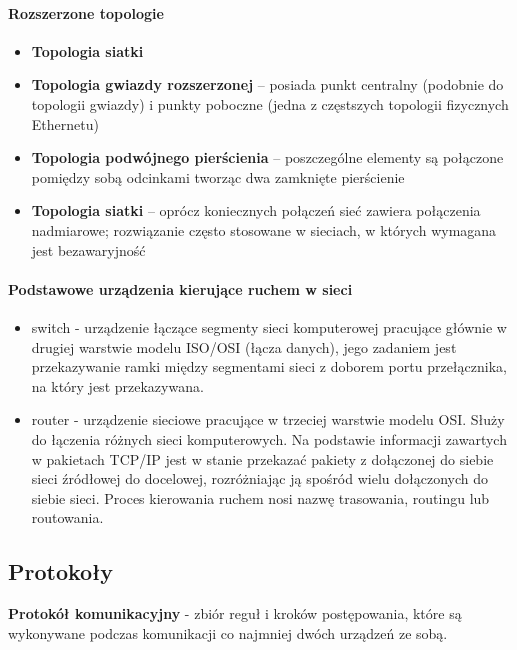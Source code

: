 \documentclass[a4paper,twoside]{report}
\begin{document}
\paragraph{Rozszerzone topologie}
\begin{itemize}
\item \textbf{Topologia siatki}
\item \textbf{Topologia gwiazdy rozszerzonej} – posiada punkt centralny (podobnie do topologii gwiazdy) i punkty poboczne (jedna z częstszych topologii fizycznych Ethernetu)
\item \textbf{Topologia podwójnego pierścienia} – poszczególne elementy są połączone pomiędzy sobą odcinkami tworząc dwa zamknięte pierścienie
\item \textbf{Topologia siatki} – oprócz koniecznych połączeń sieć zawiera połączenia nadmiarowe; rozwiązanie często stosowane w sieciach, w których wymagana jest bezawaryjność
\end{itemize}




\paragraph{Podstawowe urządzenia kierujące ruchem w sieci}
\begin{itemize}
\item switch -  urządzenie łączące segmenty sieci komputerowej pracujące głównie w drugiej warstwie modelu ISO/OSI (łącza danych), jego zadaniem jest przekazywanie ramki między segmentami sieci z doborem portu przełącznika, na który jest przekazywana.
\item router - urządzenie sieciowe pracujące w trzeciej warstwie modelu OSI. Służy do łączenia różnych sieci komputerowych. Na podstawie informacji zawartych w pakietach TCP/IP jest w stanie przekazać pakiety z dołączonej do siebie sieci źródłowej do docelowej, rozróżniając ją spośród wielu dołączonych do siebie sieci. Proces kierowania ruchem nosi nazwę trasowania, routingu lub routowania.
\end{itemize}




\subsection{Protokoły}

\textbf{Protokół komunikacyjny} - zbiór reguł i kroków postępowania, które są wykonywane podczas komunikacji co najmniej dwóch urządzeń ze sobą.
\medskip 
\end{document}
